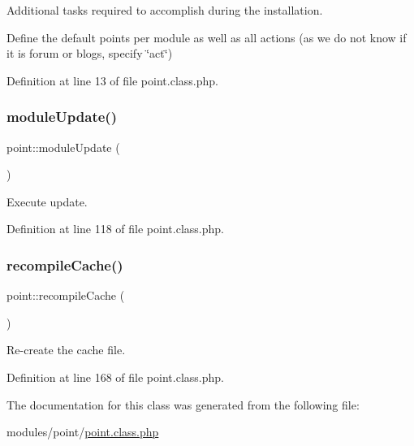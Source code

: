 Additional tasks required to accomplish during the installation. 

Define the default points per module as well as all actions (as we do not know if it is forum or blogs, specify \char`\"{}act\char`\"{})

Definition at line 13 of file point.\+class.\+php.

\hypertarget{classpoint_a7741cbf1209b73247026a7178cfc83fe}{}\label{classpoint_a7741cbf1209b73247026a7178cfc83fe} 
\subsubsection{\texorpdfstring{module\+Update()}{moduleUpdate()}}
{\footnotesize\ttfamily point\+::module\+Update (\begin{DoxyParamCaption}{ }\end{DoxyParamCaption})}



Execute update. 



Definition at line 118 of file point.\+class.\+php.

\hypertarget{classpoint_a7019f188fb82f17f8d31cd6532aa8814}{}\label{classpoint_a7019f188fb82f17f8d31cd6532aa8814} 
\subsubsection{\texorpdfstring{recompile\+Cache()}{recompileCache()}}
{\footnotesize\ttfamily point\+::recompile\+Cache (\begin{DoxyParamCaption}{ }\end{DoxyParamCaption})}



Re-\/create the cache file. 



Definition at line 168 of file point.\+class.\+php.



The documentation for this class was generated from the following file\+:\begin{DoxyCompactItemize}
\item 
modules/point/\hyperlink{point_8class_8php}{point.\+class.\+php}\end{DoxyCompactItemize}
